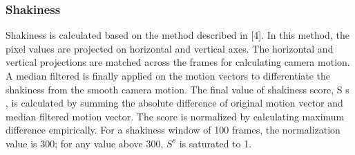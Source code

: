 \documentclass{sig-alternate-05-2015}
\begin{document}
\subsubsection{Shakiness}
Shakiness is calculated based on the method described in [4].
In this method, the pixel values are projected on horizontal and
vertical axes. The horizontal and vertical projections are matched
across the frames for calculating camera motion. A median filtered
is finally applied on the motion vectors to differentiate the shakiness from the smooth camera motion. The final value of shakiness
score, S s , is calculated by summing the absolute difference of original motion vector and median filtered motion vector. The score is
normalized by calculating maximum difference empirically. For a
shakiness window of 100 frames, the normalization value is 300;
for any value above 300, $S^s$ is saturated to 1.
\end{document}

